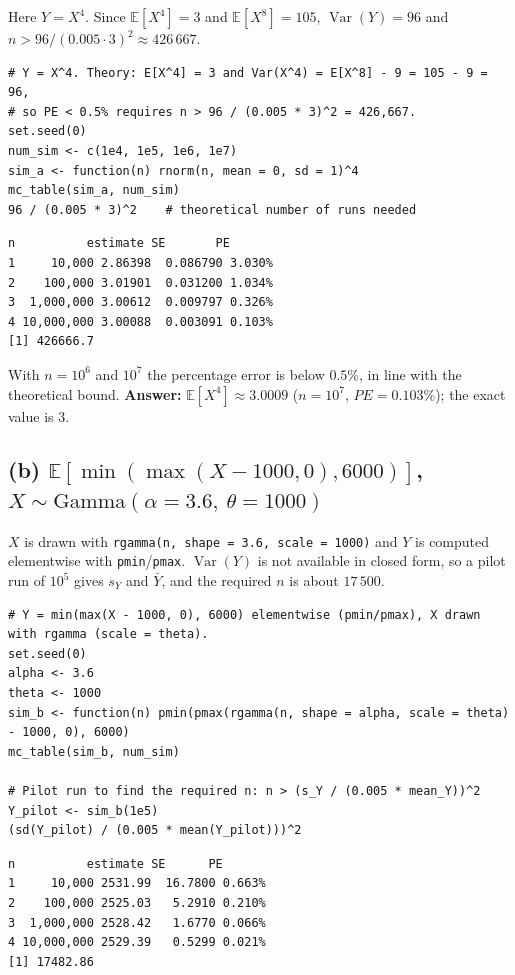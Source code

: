 \documentclass[11pt,a4paper]{article}
\begin{document}
Here $Y = X^4$. Since $\mathbb{E}[X^4] = 3$ and $\mathbb{E}[X^8] = 105$, $\operatorname{Var}(Y) = 96$ and
$n > 96/(0.005\cdot 3)^2 \approx 426\,667$.

\begin{lstlisting}
# Y = X^4. Theory: E[X^4] = 3 and Var(X^4) = E[X^8] - 9 = 105 - 9 = 96,
# so PE < 0.5% requires n > 96 / (0.005 * 3)^2 = 426,667.
set.seed(0)
num_sim <- c(1e4, 1e5, 1e6, 1e7)
sim_a <- function(n) rnorm(n, mean = 0, sd = 1)^4
mc_table(sim_a, num_sim)
96 / (0.005 * 3)^2    # theoretical number of runs needed
\end{lstlisting}
\begin{lstlisting}[style=rout]
  n          estimate SE       PE    
1     10,000 2.86398  0.086790 3.030%
2    100,000 3.01901  0.031200 1.034%
3  1,000,000 3.00612  0.009797 0.326%
4 10,000,000 3.00088  0.003091 0.103%
[1] 426666.7
\end{lstlisting}

\noindent With $n = 10^6$ and $10^7$ the percentage error is below $0.5\%$, in line with the theoretical bound.
\textbf{Answer:} $\mathbb{E}[X^4] \approx 3.0009$ ($n = 10^7$, $PE = 0.103\%$); the exact value is $3$.

\subsection*{(b) $\mathbb{E}[\min(\max(X - 1000, 0), 6000)]$, $X \sim \text{Gamma}(\alpha = 3.6,\ \theta = 1000)$}

$X$ is drawn with \texttt{rgamma(n, shape = 3.6, scale = 1000)} and $Y$ is computed elementwise with
\texttt{pmin}/\texttt{pmax}. $\operatorname{Var}(Y)$ is not available in closed form, so a pilot run of $10^5$
gives $s_Y$ and $\bar Y$, and the required $n$ is about $17\,500$.

\begin{lstlisting}
# Y = min(max(X - 1000, 0), 6000) elementwise (pmin/pmax), X drawn with rgamma (scale = theta).
set.seed(0)
alpha <- 3.6
theta <- 1000
sim_b <- function(n) pmin(pmax(rgamma(n, shape = alpha, scale = theta) - 1000, 0), 6000)
mc_table(sim_b, num_sim)

# Pilot run to find the required n: n > (s_Y / (0.005 * mean_Y))^2
Y_pilot <- sim_b(1e5)
(sd(Y_pilot) / (0.005 * mean(Y_pilot)))^2
\end{lstlisting}
\begin{lstlisting}[style=rout]
  n          estimate SE      PE    
1     10,000 2531.99  16.7800 0.663%
2    100,000 2525.03   5.2910 0.210%
3  1,000,000 2528.42   1.6770 0.066%
4 10,000,000 2529.39   0.5299 0.021%
[1] 17482.86
\end{lstlisting}
\end{document}
